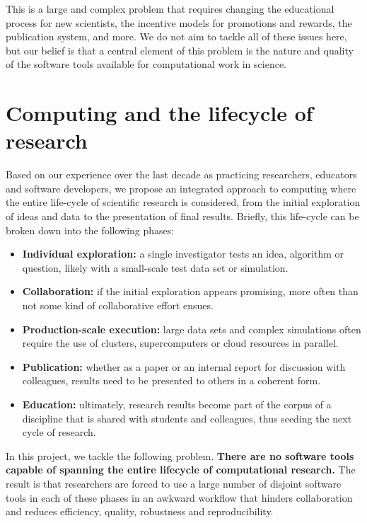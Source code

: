\documentclass[12pt]{article}
\begin{document}
This is a large and complex problem that requires changing the educational
process for new scientists, the incentive models for promotions and
rewards, the publication system, and more. We do not aim to tackle
all of these issues here, but our belief is that a central element
of this problem is the nature and quality of the software tools available
for computational work in science. 

\section{Computing and the lifecycle of research}

Based on our experience over the
last decade as practicing researchers, educators and software developers,
we propose an integrated approach to computing where the entire life-cycle
of scientific research is considered, from the initial exploration
of ideas and data to the presentation of final results. Briefly, this
life-cycle can be broken down into the following phases:
\begin{itemize}
\item \textbf{Individual exploration:} a single investigator tests an idea,
algorithm or question, likely with a small-scale test data set or
simulation.
\item \textbf{Collaboration:} if the initial exploration appears promising,
more often than not some kind of collaborative effort ensues.
\item \textbf{Production-scale execution:} large data sets and complex simulations
often require the use of clusters, supercomputers or cloud resources
in parallel.
\item \textbf{Publication:} whether as a paper or an internal report for
discussion with colleagues, results need to be presented to others
in a coherent form.
\item \textbf{Education:} ultimately, research results become part of the
corpus of a discipline that is shared with students and colleagues,
thus seeding the next cycle of research.
\end{itemize}
In this project, we tackle the following problem.\textbf{ There are
no software tools capable of spanning the entire lifecycle of computational
research.} The result is that researchers are forced to use a large
number of disjoint software tools in each of these phases in an awkward
workflow that hinders collaboration and reduces efficiency, quality,
robustness and reproducibility.
\end{document}
